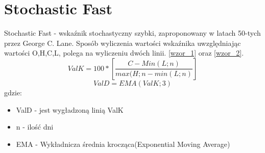 \section{Stochastic Fast}
\label{sec:1STF}

Stochastic Fast - wskaźnik stochastyczny szybki, zaproponowany w latach 50-tych przez George C. Lane. Sposób wyliczenia wartości wskaźnika uwzględniając wartości O,H,C,L, polega na wyliczeniu dwóch linii. \ref{wzor_1} oraz \ref{wzor_2}.
\begin{equation}
ValK=100*[ \frac{C-Min(L;n)}{max(H;n - min(L;n)}]
\label{wzor_1}
\end{equation}
\begin{equation}
ValD=EMA(ValK;3)
\label{wzor_2}
\end{equation}
gdzie:
\begin{itemize}
\item ValD - jest wygładzoną linią ValK
\item n - ilość dni
\item EMA - Wykładnicza średnia krocząca(Exponential Moving Average)
\end{itemize}

